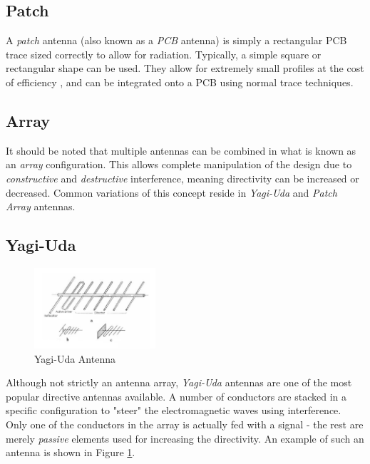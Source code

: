 \subsection{Patch}
A \textit{patch} antenna (also known as a \textit{PCB} antenna) is simply a rectangular PCB trace sized correctly to allow for radiation. Typically, a simple square or rectangular shape can be used. They allow for extremely small profiles at the cost of efficiency \cite{site-antennaTheory}, and can be integrated onto a PCB using normal trace techniques.

\subsection{Array}
It should be noted that multiple antennas can be combined in what is known as an \textit{array} configuration. This allows complete manipulation of the design due to \textit{constructive} and \textit{destructive} interference, meaning directivity can be increased or decreased. Common variations of this concept reside in \textit{Yagi-Uda} and \textit{Patch Array} antennas.

\subsection{Yagi-Uda}
\begin{figure}[!htb]
  \centering
  \includegraphics[width=0.4\textwidth]{yagi}
  \caption{Yagi-Uda Antenna \cite{site-icantennasYagi}}
  \label{fig:yagi}
\end{figure}
Although not strictly an antenna array, \textit{Yagi-Uda} antennas are one of the most popular directive antennas available. A number of conductors are stacked in a specific configuration to "steer" the electromagnetic waves using interference. Only one of the conductors in the array is actually fed with a signal - the rest are merely \textit{passive} elements used for increasing the directivity. An example of such an antenna is shown in Figure \ref{fig:yagi}.

